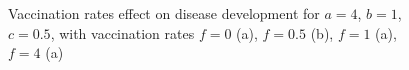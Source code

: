 \begin{figure}
    \caption{Vaccination rates effect on disease development for $a=4$, $b=1$, $c=0.5$, with vaccination rates $f=0$ (a), $f=0.5$ (b), $f=1$ (a), $f=4$ (a)}
    \label{fig:earlyvacc}
\end{figure}
